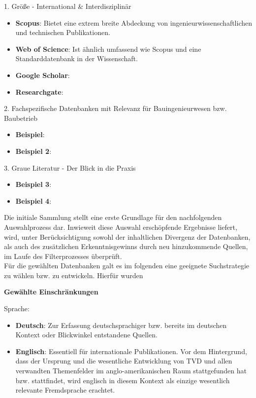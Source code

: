 1. Größe - International \& Interdisziplinär
\begin{itemize}[leftmargin=2em]
    \item \textbf{Scopus}: Bietet eine extrem breite Abdeckung von ingenieurwissenschaftlichen und technischen Publikationen.
    \item \textbf{Web of Science}: Ist ähnlich umfassend wie Scopus und eine Standarddatenbank in der Wissenschaft.
    \item \textbf{Google Scholar}:
    \item \textbf{Researchgate}:
    
\end{itemize}
2. Fachspezifische Datenbanken mit Relevanz für Bauingenieurwesen bzw. Baubetrieb
\begin{itemize}[leftmargin=2em]
    \item \textbf{Beispiel}: 
    \item \textbf{Beispiel 2}: 
\end{itemize}
3. Graue Literatur - Der Blick in die Praxis
\begin{itemize}[leftmargin=2em]
    \item \textbf{Beispiel 3}: 
    \item \textbf{Beispiel 4}: 
\end{itemize}

Die initiale Sammlung stellt eine erste Grundlage für den nachfolgenden Auswahlprozess dar. Inwieweit diese Auswahl erschöpfende Ergebnisse liefert, wird, unter Berücksichtigung sowohl der inhaltlichen Divergenz der Datenbanken, als auch des zusätzlichen Erkenntnisgewinns durch neu hinzukommende Quellen, im Laufe des Filterprozesses überprüft.\\
Für die gewählten Datenbanken galt es im folgenden eine geeignete Suchstrategie zu wählen bzw. zu entwickeln. Hierfür wurden 

\textbf {Gewählte Einschränkungen}

Sprache: 
\begin{itemize}[leftmargin=2em]
\item \textbf{Deutsch}: Zur Erfassung deutschsprachiger bzw. bereits im deutschen Kontext oder Blickwinkel entstandene Quellen.
\item \textbf{Englisch}: Essentiell für internationale Publikationen. Vor dem Hintergrund, dass der Ursprung und die wesentliche Entwicklung von \ac{TVD} und allen verwandten Themenfelder im anglo-amerikanischen Raum stattgefunden hat bzw. stattfindet, wird englisch in diesem Kontext als einzige wesentlich relevante Fremdsprache erachtet.
\end{itemize}


